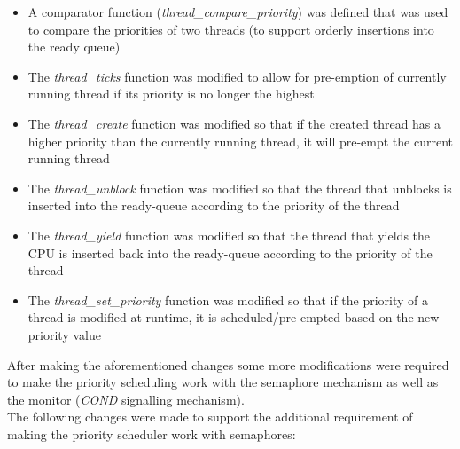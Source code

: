 \documentclass[]{article}
\begin{document}
		\begin{itemize}
			\item A comparator function (\textit{thread\_compare\_priority}) was defined that was used to compare the priorities of two threads (to support orderly insertions into the ready queue)
			\item The \textit{thread\_ticks} function was modified to allow for pre-emption of currently running thread if its priority is no longer the highest
			\item The \textit{thread\_create} function was modified so that if the created thread has a higher priority than the currently running thread, it will pre-empt the current running thread
			\item The \textit{thread\_unblock} function was modified so that the thread that unblocks is inserted into the ready-queue according to the priority of the thread
			\item The \textit{thread\_yield} function was modified so that the thread that yields the CPU is inserted back into the ready-queue according to the priority of the thread
			\item The \textit{thread\_set\_priority} function was modified so that if the priority of a thread is modified at runtime, it is scheduled/pre-empted based on the new priority value
		\end{itemize}
		After making the aforementioned changes some more modifications were required to make the priority scheduling work with the semaphore mechanism as well as the monitor (\textit{COND} signalling mechanism).\\
		The following changes were made to support the additional requirement of making the priority scheduler work with semaphores:
\end{document}
